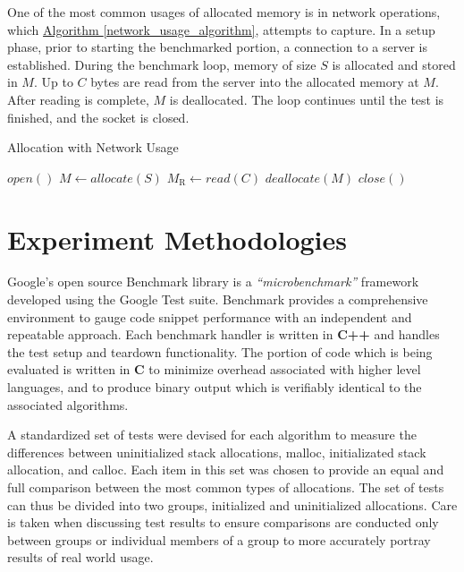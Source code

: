 \documentclass[letterpaper, 10 pt, conference]{ieeeconf}  %
\begin{document}
One of the most common usages of allocated memory is in network operations, which \hyperref[network_usage_algorithm]{Algorithm \ref*{network_usage_algorithm}}, attempts to capture.
In a setup phase, prior to starting the benchmarked portion, a connection to a server is established.
During the benchmark loop, memory of size $S$ is allocated and stored in $M$.
Up to $C$ bytes are read from the server into the allocated memory at $M$.
After reading is complete, $M$ is deallocated.
The loop continues until the test is finished, and the socket is closed.

\begin{algorithm}[h]
  \caption{Allocation with Network Usage}
  \label{network_usage_algorithm}
  \begin{algorithmic}
    \STATE $open()$
      \STATE $M \leftarrow allocate(S)$
      \STATE $M_\text{R} \leftarrow read(C)$
      \STATE $deallocate(M)$
    \ENDWHILE
    \STATE $close()$
  \end{algorithmic}
\end{algorithm}


\section{Experiment Methodologies}
Google's open source Benchmark library is a \textit{``microbenchmark''} framework developed using the Google Test suite.
Benchmark provides a comprehensive environment to gauge code snippet performance with an independent and repeatable approach.
Each benchmark handler is written in \textbf{C++} and handles the test setup and teardown functionality.
The portion of code which is being evaluated is written in \textbf{C} to minimize overhead associated with higher level languages, and to produce binary output which is verifiably identical to the associated algorithms.

A standardized set of tests were devised for each algorithm to measure the differences between uninitialized stack allocations, malloc, initializated stack allocation, and calloc.
Each item in this set was chosen to provide an equal and full comparison between the most common types of allocations.
The set of tests can thus be divided into two groups, initialized and uninitialized allocations.
Care is taken when discussing test results to ensure comparisons are conducted only between groups or individual members of a group to more accurately portray results of real world usage. 
\end{document}
